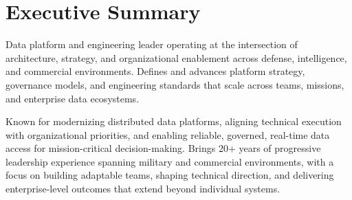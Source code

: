 \section{Executive Summary}

Data platform and engineering leader operating at the intersection of architecture, strategy, and organizational enablement across defense, intelligence, and commercial environments. Defines and advances platform strategy, governance models, and engineering standards that scale across teams, missions, and enterprise data ecosystems.

Known for modernizing distributed data platforms, aligning technical execution with organizational priorities, and enabling reliable, governed, real-time data access for mission-critical decision-making. Brings 20+ years of progressive leadership experience spanning military and commercial environments, with a focus on building adaptable teams, shaping technical direction, and delivering enterprise-level outcomes that extend beyond individual systems.
